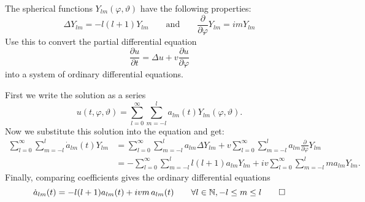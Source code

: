 The spherical functions $Y_{lm}(\varphi,\vartheta)$ have the following
properties:
\[
\Delta Y_{lm} = -l(l+1)Y_{lm}
\qquad
\text{and}
\qquad
\frac{\partial}{\partial\varphi}Y_{lm}
=
im Y_{lm}
\]
Use this to convert the partial differential equation
\[
\frac{\partial u}{\partial t}
=
\Delta u + v \frac{\partial u}{\partial\varphi}
\]
into a system of ordinary differential equations.

\begin{loesung}
First we write the solution as a series 
\[
u(t,\varphi,\vartheta)
=
\sum_{l=0}^\infty \sum_{m=-l}^l
a_{lm}(t) Y_{lm}(\varphi,\vartheta).
\]
Now we substitute this solution into the equation and get:
\begin{align*}
\sum_{l=0}^\infty \sum_{m=-l}^l
\dot{a}_{lm}(t) Y_{lm}
&=
\sum_{l=0}^\infty \sum_{m=-l}^l
a_{lm}
\Delta Y_{lm}
+
v
\sum_{l=0}^\infty \sum_{m=-l}^l
a_{lm}
\frac{\partial}{\partial\varphi} Y_{lm}
\\
&=
-
\sum_{l=0}^\infty \sum_{m=-l}^l
l(l+1)
a_{lm}
Y_{lm}
+
i
v
\sum_{l=0}^\infty \sum_{m=-l}^l
m
a_{lm}
Y_{lm}.
\end{align*}
Finally, comparing coefficients gives the ordinary differential
equations
\[
\dot{a}_{lm}(t) = -l(l+1) a_{lm}(t) + ivm\, a_{lm}(t)
\qquad
\forall l\in\mathbb{N}, -l\le m\le l
\qedhere
\]
\end{loesung}


